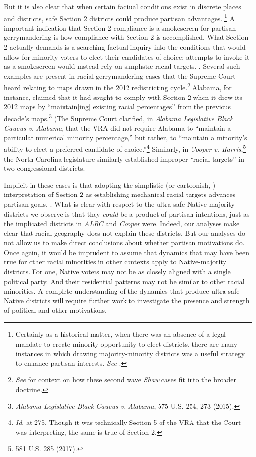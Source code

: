 \documentclass[12pt]{article}
\begin{document}
But it is also clear that when certain factual conditions exist in discrete places and districts, safe Section 2 districts could produce partisan advantages. \footnote{Certainly as a historical matter, when there was an absence of a legal mandate to create minority opportunity-to-elect districts, there are many instances in which drawing majority-minority districts was a useful strategy to enhance partisan interests.  \textit{See} \cite{crum2024riddle}.} A important indication that Section 2 compliance is a smokescreen for partisan gerrymandering is how compliance with Section 2 is accomplished. What Section 2 actually demands is a searching factual inquiry into the conditions that would allow for minority voters to elect their candidates-of-choice; attempts to invoke it as a smokescreen would instead rely on simplistic racial targets.  \cite{levitt2015quick}.  Several such examples are present in racial gerrymandering cases that the Supreme Court heard relating to maps drawn in the 2012 redistricting cycle.\footnote{\textit{See} \cite{crum2024riddle} for context on how these second wave \textit{Shaw} cases fit into the broader doctrine.}  Alabama, for instance, claimed that it had sought to comply with Section 2 when it drew its 2012 maps by ``maintain[ing] existing racial percentages'' from the previous decade's maps.\footnote{\textit{Alabama Legislative Black Caucus v. Alabama}, 575 U.S. 254, 273 (2015).} (The Supreme Court clarified, in \textit{Alabama Legislative Black Caucus v. Alabama}, that the VRA did not require Alabama to ``maintain a particular numerical minority percentage,'' but rather, to ``maintain a minority's ability to elect a preferred candidate of choice.''\footnote{\textit{Id}. at 275. Though it was technically Section 5 of the VRA that the Court was interpreting, the same is true of Section 2.} Similarly, in \textit{Cooper v. Harris},\footnote{581 U.S. 285 (2017).} the North Carolina legislature similarly established improper ``racial targets'' in two congressional districts.

Implicit in these cases is that adopting the simplistic (or cartoonish, \cite{levitt2015quick}) interpretation of Section 2 as establishing mechanical racial targets advances partisan goals. \cite{hasen2015racial,hasen2016election,hasen2017race,levitt2017race,stephanopoulos2017walking}.  What is clear with respect to the ultra-safe Native-majority districts we observe is that they \textit{could} be a product of partisan intentions, just as the implicated districts in \textit{ALBC} and \textit{Cooper} were.  Indeed, our analyses make clear that racial geography does not explain these districts.  But our analyses do not allow us to make direct conclusions about whether partisan motivations do.  Once again, it would be imprudent to assume that dynamics that may have been true for other racial minorities in other contexts apply to Native-majority districts.  For one, Native voters may not be as closely aligned with a single political party.  And their residential patterns may not be similar to other racial minorities.  A complete understanding of the dynamics that produce ultra-safe Native districts will require further work to investigate the presence and strength of political and other motivations.
\end{document}
